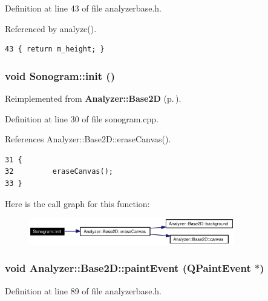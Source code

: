 Definition at line 43 of file analyzerbase.h.

Referenced by analyze().



\footnotesize\begin{verbatim}43 { return m_height; }
\end{verbatim}\normalsize 
{}
\subsubsection{\setlength{\rightskip}{0pt plus 5cm}void Sonogram::init ()\hspace{0.3cm}{\tt  [virtual]}}\label{classSonogram_Sonograma2}




Reimplemented from {\bf Analyzer::Base2D} {\rm (p.\,\pageref{classAnalyzer_1_1Base2D_Analyzer_1_1Base2Db1})}.

Definition at line 30 of file sonogram.cpp.

References Analyzer::Base2D::erase\-Canvas().



\footnotesize\begin{verbatim}31 {
32         eraseCanvas();
33 }
\end{verbatim}\normalsize 


Here is the call graph for this function:\begin{figure}[H]
\begin{center}
\leavevmode
\includegraphics[width=254pt]{classSonogram_Sonograma2_cgraph}
\end{center}
\end{figure}
\subsubsection{\setlength{\rightskip}{0pt plus 5cm}void Analyzer::Base2D::paint\-Event (QPaint\-Event $\ast$)\hspace{0.3cm}{\tt  [inline, protected, inherited]}}\label{classAnalyzer_1_1Base2D_Sonogramb2}




Definition at line 89 of file analyzerbase.h.

